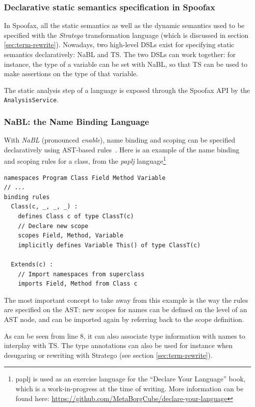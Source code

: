 \subsubsection{Declarative static semantics specification in Spoofax}
\label{sec:orgheadline3}
In Spoofax, all the static semantics as well as the dynamic semantics
used to be specified with the \emph{Stratego} transformation language
(which is discussed in section \ref{sec:term-rewrite}). Nowadays, two
high-level DSLs exist for specifying static semantics declaratively:
NaBL and TS. The two DSLs can work together: for instance, the type of
a variable can be set with NaBL, so that TS can be used to make
assertions on the type of that variable.

The static analysis step of a language is exposed through the Spoofax
API by the \texttt{AnalysisService}.
\subsubsection{NaBL: the Name Binding Language}
\label{sec:nabl}
With \emph{NaBL} (pronounced \emph{enable}), name binding and scoping can be
specified declaratively using AST-based
rules~\cite{KonatKWV12}. Here is an example of the name binding
and scoping rules for a class, from the \emph{paplj}
language\footnote{paplj is used as an exercise language for the
``Declare Your Language'' book, which is a work-in-progress at the time
of writing. More information can be found here:
\url{https://github.com/MetaBorgCube/declare-your-language}}
\lstset{language=nabl,numbers=left}
\begin{lstlisting}
namespaces Program Class Field Method Variable
// ...
binding rules
  Class(c, _, _, _) :
    defines Class c of type ClassT(c)
    // Declare new scope
    scopes Field, Method, Variable
    implicitly defines Variable This() of type ClassT(c)

  Extends(c) :
    // Import namespaces from superclass
    imports Field, Method from Class c
\end{lstlisting}
The most important concept to take away from this example is the way
the rules are specified on the AST: new scopes for names can be
defined on the level of an AST node, and can be imported again by
referring back to the scope definition.

As can be seen from line 8, it can also associate type information
with names to interplay with TS. The type annotations can also be used
for instance when desugaring or rewriting with Stratego (see section
\ref{sec:term-rewrite}).
